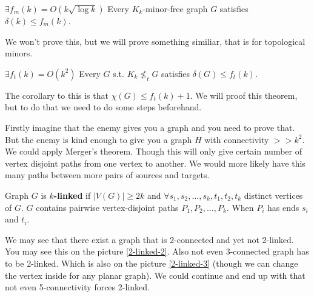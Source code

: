 \begin{thm}
	$\exists f_{m}(k) = O(k \sqrt{\log k})$ Every $K_{k}$-minor-free graph $G$ satisfies $\delta(k) \leq f_{m}(k)$.
\end{thm}

We won't prove this, but we will prove something similiar, that is for topological minors.

\begin{thm}
	$\exists f_{t}(k) = O(k^{2})$ Every $G$ s.t. $K_{k} \nleq_{t} G$ satisfies $\delta(G) \leq f_{t}(k)$.
\end{thm}

The corollary to this is that $\chi(G) \leq f_{t}(k) +1$. We will proof this theorem, but to do that we need to do some steps beforehand.

Firstly imagine that the enemy gives you a graph and you need to prove that. But the enemy is kind enough to give you a graph $H$ with connectivity $>> k^2$. We could apply Merger's theorem. Though this will only give certain number of vertex disjoint paths from one vertex to another. We would more likely have this many paths between more pairs of sources and targets.

\begin{defn}
	Graph $G$ is \textbf{$k$-linked} if $|V(G)| \geq 2k$ and $\forall s_{1}, s_{2}, \dots, s_{k}, t_{1}, t_{2}, t_{k}$ distinct vertices of $G$. $G$ contains pairwise vertex-disjoint paths $P_{1}, P_{2}, \dots, P_{k}$. When $P_{i}$ has ends $s_{i}$ and $t_{i}$.
\end{defn}

We may see that there exist a graph that is 2-connected and yet not 2-linked. You may see this on the picture \ref{2-linked-2}. Also not even 3-connected graph has to be 2-linked. Which is also on the picture \ref{2-linked-3} (though we can change the vertex inside for any planar graph). We could continue and end up with that not even 5-connectivity forces 2-linked.

